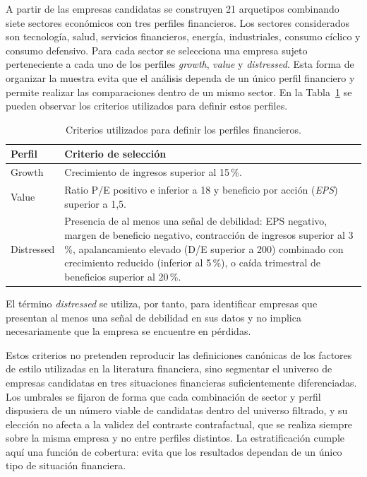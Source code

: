A partir de las empresas candidatas se construyen 21 arquetipos combinando siete sectores económicos con tres perfiles financieros. Los sectores considerados son tecnología, salud, servicios financieros, energía, industriales, consumo cíclico y consumo defensivo. Para cada sector se selecciona una empresa sujeto perteneciente a cada uno de los perfiles \textit{growth}, \textit{value} y \textit{distressed}. Esta forma de organizar la muestra evita que el análisis dependa de un único perfil financiero y permite realizar las comparaciones dentro de un mismo sector. En la Tabla~\ref{tab:perfiles_financieros} se pueden observar los criterios utilizados para definir estos perfiles.

\begin{table}[htbp]
	\centering
	\caption{Criterios utilizados para definir los perfiles financieros.}
	\label{tab:perfiles_financieros}
	\begin{tabular}{p{2.5cm} p{10cm}}
		\hline
		\textbf{Perfil} & \textbf{Criterio de selección} \\
		\hline
		
		Growth &
		Crecimiento de ingresos superior al 15\,\%. \\
		
		Value &
		Ratio P/E positivo e inferior a 18 y beneficio por acción
		(\textit{EPS}) superior a 1,5. \\
		
		Distressed &
		Presencia de al menos una señal de debilidad: EPS negativo,
		margen de beneficio negativo, contracción de ingresos superior
		al 3\,\%, apalancamiento elevado (D/E superior a 200) combinado con crecimiento
		reducido (inferior al 5\,\%), o caída trimestral de beneficios superior al 20\,\%. \\
		
		\hline
	\end{tabular}
\end{table}

El término \textit{distressed} se utiliza, por tanto, para identificar empresas
que presentan al menos una señal de debilidad en sus datos y no implica
necesariamente que la empresa se encuentre en pérdidas.

Estos criterios no pretenden reproducir las definiciones canónicas de los factores de estilo utilizadas en la literatura financiera, sino segmentar el universo de empresas candidatas en tres situaciones financieras suficientemente diferenciadas. Los umbrales se fijaron de forma que cada combinación de sector y perfil dispusiera de un número viable de candidatas dentro del universo filtrado, y su elección no afecta a la validez del contraste contrafactual, que se realiza siempre sobre la misma empresa y no entre perfiles distintos. La estratificación cumple aquí una función de cobertura: evita que los resultados dependan de un único tipo de situación financiera.

